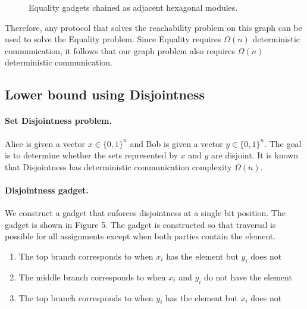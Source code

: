 \begin{figure}[h]
\centering
{}

\caption{Equality gadgets chained as adjacent hexagonal modules.}
\end{figure}

Therefore, any protocol that solves the reachability problem on this graph can be used to solve the Equality problem. Since Equality requires $\Omega(n)$ deterministic communication, it follows that our graph problem also requires $\Omega(n)$ deterministic communication.


\subsection{Lower bound using Disjointness}

\paragraph{Set Disjointness problem.}
Alice is given a vector 
$x \in \{0,1\}^n$ and Bob is given a vector $y \in \{0,1\}^n$. 
The goal is to determine whether the sets represented by $x$ and $y$ are disjoint. It is known that Disjointness has deterministic communication complexity $\Omega(n)$.

\paragraph{Disjointness gadget.}
We construct a gadget that enforces disjointness at a single bit position. The gadget is shown in Figure 5. The gadget is constructed so that traversal is possible for all assignments except when both parties contain the element.

\begin{enumerate}
    \item The top branch corresponds to when $x_i$ has the element but $y_i$ does not
    \item The middle branch corresponds to when $x_i$ and $y_i$ do not have the element
    \item The top branch corresponds to when $y_i$ has the element but $x_i$ does not
\end{enumerate}



